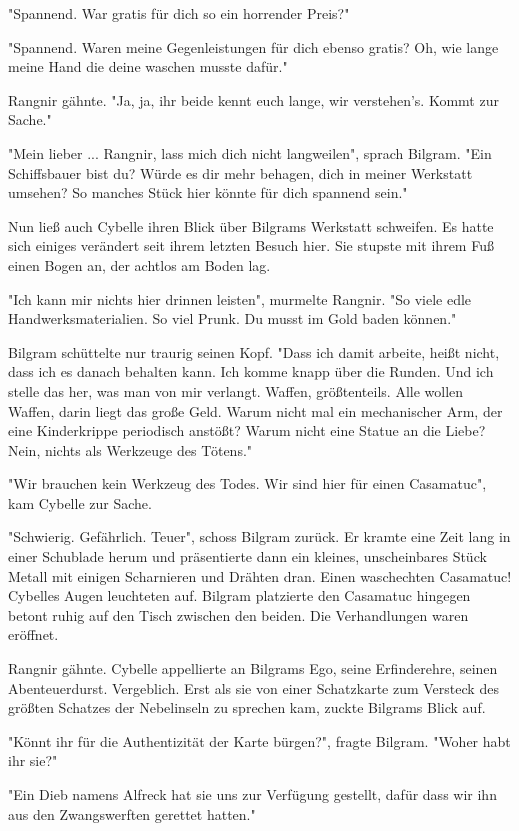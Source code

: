 "Spannend. War gratis für dich so ein horrender Preis?"

"Spannend. Waren meine Gegenleistungen für dich ebenso gratis? Oh, wie lange meine Hand die deine waschen musste dafür."

Rangnir gähnte. "Ja, ja, ihr beide kennt euch lange, wir verstehen's. Kommt zur Sache."

"Mein lieber ... Rangnir, lass mich dich nicht langweilen", sprach Bilgram. "Ein Schiffsbauer bist du? Würde es dir mehr behagen, dich in meiner Werkstatt umsehen? So manches Stück hier könnte für dich spannend sein."



Nun ließ auch Cybelle ihren Blick über Bilgrams Werkstatt schweifen. Es hatte sich einiges verändert seit ihrem letzten Besuch hier. Sie stupste mit ihrem Fuß einen Bogen an, der achtlos am Boden lag.

"Ich kann mir nichts hier drinnen leisten", murmelte Rangnir. "So viele edle Handwerksmaterialien. So viel Prunk. Du musst im Gold baden können."

Bilgram schüttelte nur traurig seinen Kopf. "Dass ich damit arbeite, heißt nicht, dass ich es danach behalten kann. Ich komme knapp über die Runden. Und ich stelle das her, was man von mir verlangt. Waffen, größtenteils. Alle wollen Waffen, darin liegt das große Geld. Warum nicht mal ein mechanischer Arm, der eine Kinderkrippe periodisch anstößt? Warum nicht eine Statue an die Liebe? Nein, nichts als Werkzeuge des Tötens."

"Wir brauchen kein Werkzeug des Todes. Wir sind hier für einen Casamatuc", kam Cybelle zur Sache.

"Schwierig. Gefährlich. Teuer", schoss Bilgram zurück. Er kramte eine Zeit lang in einer Schublade herum und präsentierte dann ein kleines,
unscheinbares Stück Metall mit einigen Scharnieren und Drähten dran. Einen waschechten Casamatuc! Cybelles Augen leuchteten auf. Bilgram platzierte den Casamatuc hingegen betont ruhig auf den Tisch zwischen den beiden. Die Verhandlungen waren eröffnet.

Rangnir gähnte. Cybelle appellierte an Bilgrams Ego, seine Erfinderehre, seinen Abenteuerdurst. Vergeblich. Erst als sie von einer Schatzkarte zum Versteck des größten Schatzes der Nebelinseln zu sprechen kam, zuckte Bilgrams Blick auf.

"Könnt ihr für die Authentizität der Karte bürgen?", fragte Bilgram. "Woher habt ihr sie?"

"Ein Dieb namens Alfreck hat sie uns zur Verfügung gestellt, dafür dass wir ihn aus den Zwangswerften gerettet hatten."

